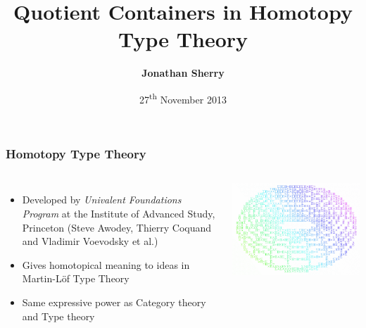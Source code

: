 \documentclass{beamer}
\title[Quotient Containers in Homotopy Type Theory]{Quotient Containers in Homotopy Type Theory} %
\author{\textbf{Jonathan Sherry}} %
\institute[University of Nottingham] %
{
\small{Supervisor: Thorsten Altenkirch}\\
University of Nottingham  %
}
\date{27\textsuperscript{th} November  2013 } %
\begin{document}
\begin{frame}
\titlepage %
\end{frame}



\begin{frame}
\frametitle{Homotopy Type Theory}
\begin{columns}[c]

\begin{itemize}
\item \scriptsize{Developed by \textit{Univalent Foundations Program} at the Institute of Advanced Study, Princeton (Steve Awodey, Thierry Coquand and Vladimir Voevodsky et al.)}
\item \scriptsize{Gives homotopical meaning to ideas in Martin-L\"of Type Theory}
\item Same expressive power as Category theory and Type theory
\end{itemize}

\begin{flushleft}
\includegraphics[scale=0.23]{1.png}
\end{flushleft}


\end{columns}

\end{frame}

\end{document}
